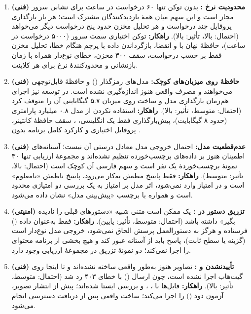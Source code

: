 \documentclass[12pt]{article}
\newcommand{\code}[1]{\lr{\texttt{#1}}}
\begin{document}
 \begin{enumerate}
\item \textbf{(فنی) محدودیت نرخ :} بدون توکن تنها ۶۰ درخواست در ساعت برای نشانی  سرور مجاز است و این سهم میان همهٔ بازدیدکنندگان مشترک است؛ هر بار بارگذاری پروفایل چند درخواست و هر تحلیل مخزن حدود پنج درخواست دیگر می‌خواهد (احتمال: بالا، تأثیر: بالا). \textbf{راهکار:} توکن اختیاری سمت سرور (۵۰۰۰ درخواست در ساعت)، حافظهٔ نهان با  و انقضا، بازگرداندن داده با پرچم  هنگام خطا، تحلیل مخزن فقط بر حسب درخواست، سقف ۳۰۰ مخزن، خطای نوع‌دار  همراه با زمان بازنشانی و محدودکنندهٔ نرخ برای هر کلاینت.
\item \textbf{(فنی) حافظهٔ  روی میزبان‌های کوچک:} مدل‌های رمزگذار () و  حافظهٔ قابل‌توجهی می‌خواهند و مصرف واقعی هنوز اندازه‌گیری نشده است. در توسعه نیز اجرای هم‌زمان بارگذاری مدل و ساخت  روی میزبان ۵.۷ گیگابایتی آن را متوقف کرد (احتمال: متوسط، تأثیر: بالا). \textbf{راهکار:} استفاده نکردن از مدل ۰.۸ میلیارد پارامتری  (حدود ۸ گیگابایت)، پیش‌بارگذاری فقط یک  انگلیسی، \code{LAYA\_MAX\_LOADED=1}، سقف حافظهٔ کانتینر، پروفایل اختیاری  و کارکرد کامل برنامه بدون .
\item \textbf{(فنی) عدم‌قطعیت مدل:} احتمال خروجی مدل معادل درستی آن نیست؛ آستانه‌های اطمینان هنوز بر داده‌های برچسب‌خورده تنظیم نشده‌اند و مجموعهٔ ارزیابی تنها ۳۰ نمونهٔ برچسب‌خوردهٔ یک نفر است و سهم فارسی آن کوچک است (احتمال: بالا، تأثیر: متوسط). \textbf{راهکار:} فقط پاسخ مطمئن به‌کار می‌رود، پاسخ ناطمئن «نامعلوم» است و در امتیاز وارد نمی‌شود، اثر مدل بر امتیاز به یک بررسی دو امتیازی محدود است و همواره با برچسب «پیش‌بینی مدل» نشان داده می‌شود.
\item \textbf{(امنیتی) تزریق دستور در :} یک  ممکن است متنی شبیه «دستورهای قبلی را نادیده بگیر» داشته باشد (احتمال: متوسط، تأثیر: پایین). \textbf{راهکار:}  فقط به‌عنوان داده () فرستاده و هرگز به دستورالعمل پرسش الحاق نمی‌شود، خروجی مدل نوع‌دار است (گزینه یا سطح ثابت)، پاسخ باید از آستانه عبور کند و هیچ بخشی از برنامه محتوای  را اجرا نمی‌کند؛ دو نمونهٔ تزریق در مجموعهٔ ارزیابی وجود دارد.
\item \textbf{(فنی) تأییدنشدن  و :} تصاویر هنوز به‌طور واقعی ساخته نشده‌اند و  تا اینجا روی گیت‌هاب اجرا نشده است، چون ارسال () با خطای ۴۰۳ رد شد (احتمال: متوسط، تأثیر: بالا). \textbf{راهکار:} فایل‌ها با ، ،  و \code{compose config} بررسی ایستا شده‌اند؛  پیش از انتشار تصویر، آزمون دود () را اجرا می‌کند؛ ساخت واقعی پس از دریافت دسترسی انجام می‌شود.

\end{enumerate}
\end{document}
